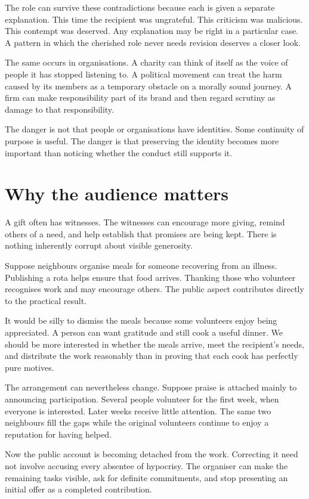 \documentclass[12pt,a4paper]{book}
\begin{document}
The role can survive these contradictions because each is given a separate explanation. This time the recipient was ungrateful. This criticism was malicious. This contempt was deserved. Any explanation may be right in a particular case. A pattern in which the cherished role never needs revision deserves a closer look.

The same occurs in organisations. A charity can think of itself as the voice of people it has stopped listening to. A political movement can treat the harm caused by its members as a temporary obstacle on a morally sound journey. A firm can make responsibility part of its brand and then regard scrutiny as damage to that responsibility.

The danger is not that people or organisations have identities. Some continuity of purpose is useful. The danger is that preserving the identity becomes more important than noticing whether the conduct still supports it.

\section*{Why the audience matters}

A gift often has witnesses. The witnesses can encourage more giving, remind others of a need, and help establish that promises are being kept. There is nothing inherently corrupt about visible generosity.

Suppose neighbours organise meals for someone recovering from an illness. Publishing a rota helps ensure that food arrives. Thanking those who volunteer recognises work and may encourage others. The public aspect contributes directly to the practical result.

It would be silly to dismiss the meals because some volunteers enjoy being appreciated. A person can want gratitude and still cook a useful dinner. We should be more interested in whether the meals arrive, meet the recipient's needs, and distribute the work reasonably than in proving that each cook has perfectly pure motives.

The arrangement can nevertheless change. Suppose praise is attached mainly to announcing participation. Several people volunteer for the first week, when everyone is interested. Later weeks receive little attention. The same two neighbours fill the gaps while the original volunteers continue to enjoy a reputation for having helped.

Now the public account is becoming detached from the work. Correcting it need not involve accusing every absentee of hypocrisy. The organiser can make the remaining tasks visible, ask for definite commitments, and stop presenting an initial offer as a completed contribution.
\end{document}
